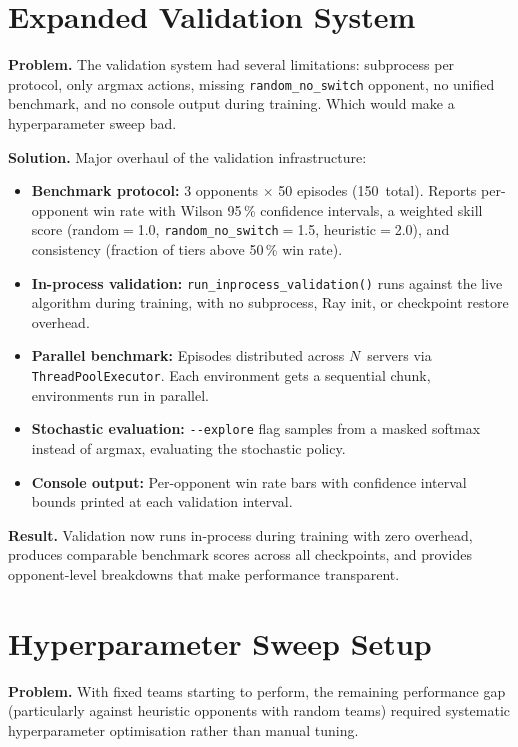 \section{Expanded Validation System}

\textbf{Problem.} The validation system had several limitations: subprocess
per protocol, only argmax actions, missing
\texttt{random\_no\_switch} opponent, no unified benchmark, and no console
output during training. Which would make a hyperparameter sweep bad.

\textbf{Solution.} Major overhaul of the validation infrastructure:
\begin{itemize}
  \item \textbf{Benchmark protocol:} 3 opponents $\times$ 50 episodes
        (150~total).  Reports per-opponent win rate with Wilson 95\,\%
        confidence intervals, a weighted skill score (random$=$1.0,
        \texttt{random\_no\_switch}$=$1.5, heuristic$=$2.0), and consistency
        (fraction of tiers above 50\,\% win rate).
  \item \textbf{In-process validation:} \texttt{run\_inprocess\_validation()}
        runs against the live algorithm during training, with no subprocess,
        Ray init, or checkpoint restore overhead.
  \item \textbf{Parallel benchmark:} Episodes distributed across $N$~servers
        via \texttt{ThreadPoolExecutor}.  Each environment gets a sequential
        chunk, environments run in parallel.
  \item \textbf{Stochastic evaluation:} \texttt{-{}-explore} flag samples
        from a masked softmax instead of argmax, evaluating the stochastic
        policy.
  \item \textbf{Console output:} Per-opponent win rate bars with confidence
        interval bounds printed at each validation interval.
\end{itemize}

\textbf{Result.} Validation now runs in-process during training with zero
overhead, produces comparable benchmark scores across all checkpoints, and
provides opponent-level breakdowns that make performance transparent.



\section{Hyperparameter Sweep Setup}

\textbf{Problem.} With fixed teams starting to perform, the remaining
performance gap (particularly against heuristic opponents with random teams)
required systematic hyperparameter optimisation rather than manual tuning.

